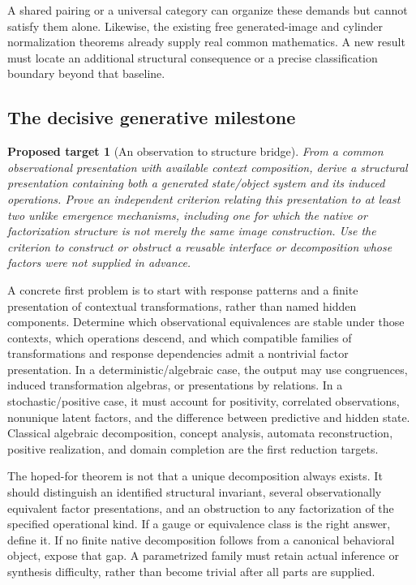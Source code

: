 \documentclass[11pt]{article}
\newtheorem{target}[definition]{Proposed target}
\theoremstyle{remark}
\begin{document}
A shared pairing or a universal category can organize these demands but cannot satisfy them alone. Likewise, the existing free generated-image and cylinder normalization theorems already supply real common mathematics. A new result must locate an additional structural consequence or a precise classification boundary beyond that baseline.

\subsection{The decisive generative milestone}

\begin{target}[An observation to structure bridge]
\label{target:generative}
From a common observational presentation with available context composition, derive a structural presentation containing both a generated state/object system and its induced operations. Prove an independent criterion relating this presentation to at least two unlike emergence mechanisms, including one for which the native or factorization structure is not merely the same image construction. Use the criterion to construct or obstruct a reusable interface or decomposition whose factors were not supplied in advance.
\end{target}

A concrete first problem is to start with response patterns and a finite presentation of contextual transformations, rather than named hidden components. Determine which observational equivalences are stable under those contexts, which operations descend, and which compatible families of transformations and response dependencies admit a nontrivial factor presentation. In a deterministic/algebraic case, the output may use congruences, induced transformation algebras, or presentations by relations. In a stochastic/positive case, it must account for positivity, correlated observations, nonunique latent factors, and the difference between predictive and hidden state. Classical algebraic decomposition, concept analysis, automata reconstruction, positive realization, and domain completion are the first reduction targets.

The hoped-for theorem is not that a unique decomposition always exists. It should distinguish an identified structural invariant, several observationally equivalent factor presentations, and an obstruction to any factorization of the specified operational kind. If a gauge or equivalence class is the right answer, define it. If no finite native decomposition follows from a canonical behavioral object, expose that gap. A parametrized family must retain actual inference or synthesis difficulty, rather than become trivial after all parts are supplied.
\end{document}
